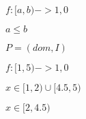 \documentclass{article}
\begin{document}
$f:[a,b)->{1,0}$
\pagebreak

$a \le b$
\pagebreak

$P = (dom, I)$
\pagebreak

$f:[1,5) -> {1,0}$
\pagebreak

$ x \in [1,2) \cup [4.5,5)$
\pagebreak

$ x \in [2,4.5)$
\pagebreak
\end{document}
